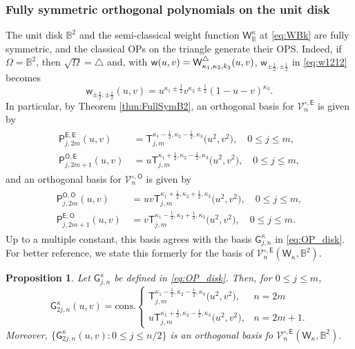 \documentclass{amsart}
\newtheorem{prop}[thm]{Proposition}
\theoremstyle{remark}
\def\sw{{\mathsf w}}
\def\sE{{\mathsf E}}
\def\sG{{\mathsf G}}
\def\sO{{\mathsf O}}
\def\sP{{\mathsf P}}
\def\sQ{{\mathsf Q}}
\def\sS{{\mathsf S}}
\def\sT{{\mathsf T}}
\def\sW{{\mathsf W}}
\def\k{{\kappa}}
\def\CV{{\mathcal V}}
\def\BB{{\mathbb B}}
\def\f{\frac}
\begin{document}
 
\subsubsection{Fully symmetric orthogonal polynomials on the unit disk}
The unit disk $\BB^2$ and the semi-classical weight function $\sW^{\k}_\BB$ at \eqref{eq:WBk} are fully symmetric,
and the classical OPs on the triangle generate their OPS. Indeed, if $\Omega = \BB^2$, then $\sqrt{\Omega} = \triangle$ 
and, with $\sw(u,v) = \sW^\triangle_{\k_1,\k_2,\\k_3}(u,v)$, $\sw_{\pm \f12,\pm\f12}$ in \eqref{eq:w1212} becomes
$$
  \sw_{\pm \f12,\pm \f12} (u,v) = u^{\k_1\pm 
  \f 12} v^{\k_2 \pm \f12} (1-u-v)^{\k_3}.    
$$
In particular, by Theorem \ref{thm:FullSymB2}, an orthogonal basis for $\CV_n^{\circ, \sE}$ is given by
\begin{align}\label{eq:OP_B-T1}
\begin{split}
    \sP_{j,2m}^{\sE,\sE}(u,v)\, & = \sT_{j,m}^{\k_1-\f12, \k_2-\f12, \k_3} \big(u^2,v^2\big), \quad 0 \le j \le m, \\   
  \sP_{j,2m+1}^{\sO, \sE}(u,v)\, & = u \sT_{j,m}^{\k_1+\f12, \k_2-\f12, \k_3} \big(u^2,v^2\big), \quad 0 \le j \le m, 
\end{split}
\end{align}
and an orthogonal basis for $\CV_n^{\circ,\sO}$ is given by
\begin{align}\label{eq:OP_B-T2}
\begin{split}
    \sP_{j,2m}^{\sO,\sO}(u,v)\, & = uv \sT_{j,m}^{\k_1+\f12, \k_2+\f12, \k_3} \big(u^2,v^2\big), \quad 0 \le j \le m, \\    
    \sP_{j,2m+1}^{\sE,\sO}(u,v)\, & = v \sT_{j,m}^{\k_1-\f12, \k_2+\f12, \k_3} \big(u^2,v^2\big), \quad 0 \le j \le m.
\end{split}
\end{align}
Up to a multiple constant, this basis agrees with the basis $\sG_{j,n}^\k$ in \eqref{eq:OP_disk}. For better
reference, we state this formerly for the basis of $\CV_n^{\circ,\sE}(\sW_\k, \BB^2)$. 

\begin{prop}  \label{prop:OP_G}
Let $\sG_{j,n}^\k$ be defined in \eqref{eq:OP_disk}. Then, for $0 \le j \le m$, 
$$
  \sG_{2j,n}^\k (u,v) = \mathrm{cons.} \begin{cases}  \sT_{j,m}^{\k_1-\f12, \k_2-\f12, \k_3} \big(u^2,v^2\big), & n = 2m \\
   u \sT_{j,m}^{\k_1+\f12, \k_2-\f12, \k_3} \big(u^2,v^2\big), & n = 2m +1 .\end{cases} 
$$
Moreover, $\{ \sG_{2j,n}^\k (u,v): 0 \le j \le n/2\}$ is an orthogonal basis fo $\CV_n^{\circ,\sE}(\sW_\k, \BB^2)$.
\end{prop}
\end{document}
